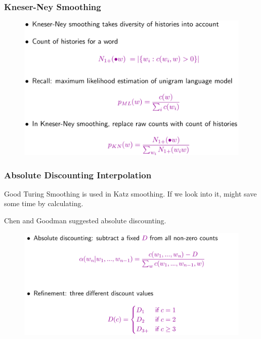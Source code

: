 \documentclass{beamer}
\begin{document}

\begin{frame}\frametitle{Kneser-Ney Smoothing}
\begin{figure}
\includegraphics[width=0.9\linewidth]{figure/kneser_ney_continuation.pdf}
\end{figure}
\end{frame}



\begin{frame}[label=go_absolute_discounting]\frametitle{Absolute Discounting Interpolation}
Good Turing Smoothing is used in Katz smoothing. If we look into 
it, might save some time by calculating. 
\hyperlink{go_good_turing}{}

Chen and Goodman suggested absolute discounting. 
\begin{figure}
\includegraphics[width=1\linewidth]{figure/absolute_discounting.pdf}
\end{figure}
\end{frame}
\end{document}
